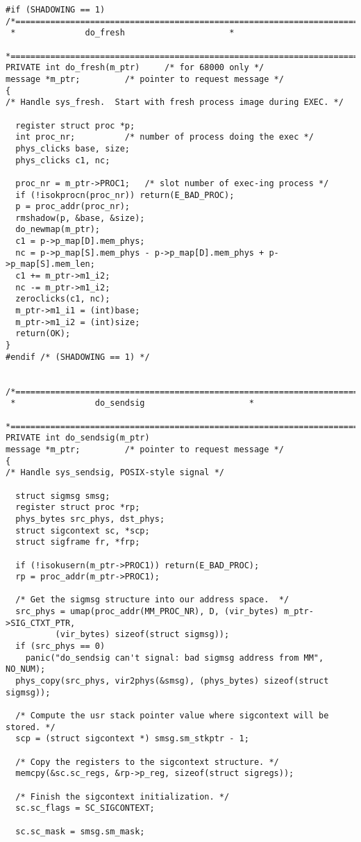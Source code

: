 \begin{verbatim}
#if (SHADOWING == 1)
/*===========================================================================*
 *				do_fresh				     *
 *===========================================================================*/
PRIVATE int do_fresh(m_ptr)     /* for 68000 only */
message *m_ptr;			/* pointer to request message */
{
/* Handle sys_fresh.  Start with fresh process image during EXEC. */

  register struct proc *p;
  int proc_nr;			/* number of process doing the exec */
  phys_clicks base, size;
  phys_clicks c1, nc;

  proc_nr = m_ptr->PROC1;	/* slot number of exec-ing process */
  if (!isokprocn(proc_nr)) return(E_BAD_PROC);
  p = proc_addr(proc_nr);
  rmshadow(p, &base, &size);
  do_newmap(m_ptr);
  c1 = p->p_map[D].mem_phys;
  nc = p->p_map[S].mem_phys - p->p_map[D].mem_phys + p->p_map[S].mem_len;
  c1 += m_ptr->m1_i2;
  nc -= m_ptr->m1_i2;
  zeroclicks(c1, nc);
  m_ptr->m1_i1 = (int)base;
  m_ptr->m1_i2 = (int)size;
  return(OK);
}
#endif /* (SHADOWING == 1) */


/*===========================================================================*
 *			      do_sendsig				     *
 *===========================================================================*/
PRIVATE int do_sendsig(m_ptr)
message *m_ptr;			/* pointer to request message */
{
/* Handle sys_sendsig, POSIX-style signal */

  struct sigmsg smsg;
  register struct proc *rp;
  phys_bytes src_phys, dst_phys;
  struct sigcontext sc, *scp;
  struct sigframe fr, *frp;

  if (!isokusern(m_ptr->PROC1)) return(E_BAD_PROC);
  rp = proc_addr(m_ptr->PROC1);

  /* Get the sigmsg structure into our address space.  */
  src_phys = umap(proc_addr(MM_PROC_NR), D, (vir_bytes) m_ptr->SIG_CTXT_PTR,
		  (vir_bytes) sizeof(struct sigmsg));
  if (src_phys == 0)
	panic("do_sendsig can't signal: bad sigmsg address from MM", NO_NUM);
  phys_copy(src_phys, vir2phys(&smsg), (phys_bytes) sizeof(struct sigmsg));

  /* Compute the usr stack pointer value where sigcontext will be stored. */
  scp = (struct sigcontext *) smsg.sm_stkptr - 1;

  /* Copy the registers to the sigcontext structure. */
  memcpy(&sc.sc_regs, &rp->p_reg, sizeof(struct sigregs));

  /* Finish the sigcontext initialization. */
  sc.sc_flags = SC_SIGCONTEXT;

  sc.sc_mask = smsg.sm_mask;


\end{verbatim}
